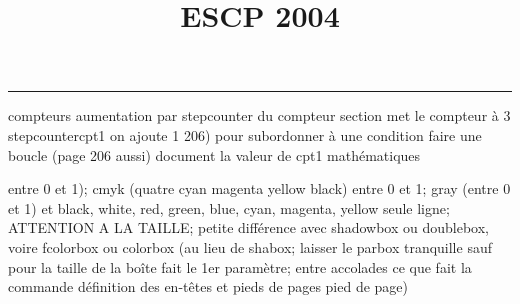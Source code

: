 \documentclass[11pt]{article}%
\title{\bf \vspace{-2cm} ESCP 2004} %
\author{} %
\date{} %
\renewcommand{\headrulewidth}{0pt}%
\renewcommand{\footrulewidth}{0.4pt}%
\begin{document}
\maketitle %
\vspace{-1.4cm}\hrule %
\thispagestyle{fancy}

\vspace*{.2cm}



compteurs%
aumentation par stepcounter du compteur section%
met le compteur à 3%
stepcounter{cpt1} on ajoute 1%
206) pour subordonner à une condition %
faire une boucle (page 206 aussi) %
document la valeur de cpt1 
mathématiques\newcommand{\ch}{\operatorname{ch}} 
\newcommand{\sh}{\operatorname{sh}}
\renewcommand{\tanh}{\operatorname{th}}
\renewcommand{\sinh}{\operatorname{sh}}
\renewcommand{\cosh}{\operatorname{ch}}
\newcommand{\argsh}{\operatorname{argsh}}
\newcommand{\argch}{\operatorname{argch}}
\newcommand{\argth}{\operatorname{argth}}
\newcommand{\ker}{\operatorname{Ker}}
\renewcommand{\im}{\operatorname{Im}}
\newcommand{\rg}{\operatorname{rg}}
\newcommand{\Id}{\operatorname{Id}}
\newcommand{\id}{\operatorname{id}}
\renewcommand{\leq}{\leq}
\renewcommand{\geq}{\geq }

entre 0 et 1); cmyk (quatre cyan magenta yellow black) entre 0 et 1;
gray (entre 0 et 1) et black, white, red, green, blue, cyan, magenta,
yellow%
seule ligne; ATTENTION A LA TAILLE; petite différence avec shadowbox ou
doublebox, voire fcolorbox ou colorbox (au lieu de shabox; laisser le
parbox tranquille sauf pour la taille de la boîte
\newcommand{\Tbox}[1]{\begin{center} \shabox{\parbox{0.6
\linewidth}{#1}} \end{center}} %
fait le 1er paramètre; entre accolades ce que fait la commande
définition des en-têtes et pieds de pages\pagestyle{fancy}
\chead{}
\rfoot[ \ \thepage]{\thepage}
\cfoot{}
\lfoot{}
\thispagestyle{fancy} %
pied de page)\renewcommand{\footrulewidth}{0.4pt}
\renewcommand{\headrulewidth}{0.4pt}
\end{document}
